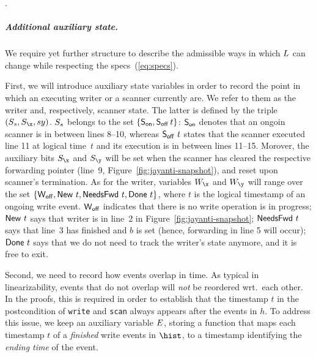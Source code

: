 .

\subparagraph*{Additional auxiliary state.} 
We require yet further structure to describe the admissible ways in
which $L$ can change while respecting the
specs~(\ref{eq:specs}).

First, we will introduce auxiliary state variables in order to record
the point in which an executing writer or a scanner currently are. We
refer to them as the writer and, respectively, scanner state. The
latter is defined by the triple $(\sss, \sx, sy)$. $S_s$ belongs to
the set $\{ \mathsf{S_{on}}, \mathsf{S_{off}}\, t\}$: $\mathsf{S_{on}}$ denotes that an ongoin scanner
is in between lines 8--10, whereas $\mathsf{S_{off}}\ t$ states that the scanner
executed line 11 at logical time\ $t$ and its execution is in between
lines 11--15. Morover, the auxiliary bits $\sx$ and $\sy$ will be set
when the scanner has cleared the respective forwarding pointer
(line~9, Figure~\ref{fig:jayanti-snapshot}), and reset upon scanner's
termination. As for the writer, variables $\wx$ and $\wy$ will range
over the set $\{ \wInit, \wWrite\ t, \wDirty\ t, \wClean\ t\}$, where
$t$ is the logical timestamp of an ongoing write event. $\mathsf{W_{off}}$
indicates that there is no write operation is in progress;
$\mathsf{New}\ t$ says that writer is in line~2 in
Figure~\ref{fig:jayanti-snapshot}; $\mathsf{NeedsFwd}\ t$ says that line~3 has
finished and $b$ is set (hence, forwarding in line 5 will occur);
$\mathsf{Done}\ t$ says that we do not need to track the writer's state
anymore, and it is free to exit.

Second, we need to record how events overlap in time. As typical in
linearizability, events that do not overlap will \emph{not} be
reordered wrt.~each other. In the proofs, this is required in order to
establish that the timestamp $t$ in the postcondition of {\tt write}
and {\tt scan} always appears after the events in $h$. To address this
issue, we keep an auxiliary variable $E$, storing a function that
maps each timestamp $t$ of a \emph{finished} write events in $\hist$,
to a timestamp identifying the \emph{ending time} of the event.
%
%

